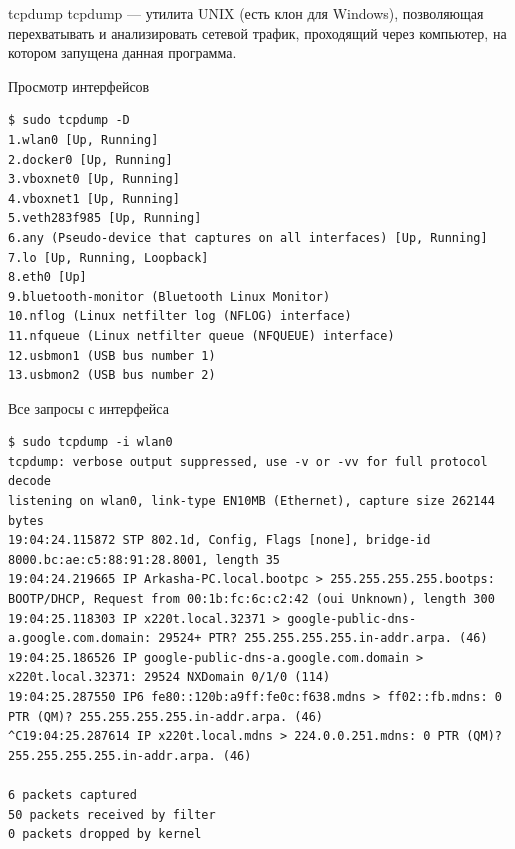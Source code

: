 \begin{frame}{tcpdump}
    tcpdump — утилита UNIX (есть клон для Windows), позволяющая перехватывать и
    анализировать сетевой трафик, проходящий через компьютер, на котором
    запущена данная программа.
\end{frame}

\begin{frame}[fragile]{Просмотр интерфейсов}
    \begin{Verbatim}[fontsize=\scriptsize]
$ sudo tcpdump -D
1.wlan0 [Up, Running]
2.docker0 [Up, Running]
3.vboxnet0 [Up, Running]
4.vboxnet1 [Up, Running]
5.veth283f985 [Up, Running]
6.any (Pseudo-device that captures on all interfaces) [Up, Running]
7.lo [Up, Running, Loopback]
8.eth0 [Up]
9.bluetooth-monitor (Bluetooth Linux Monitor)
10.nflog (Linux netfilter log (NFLOG) interface)
11.nfqueue (Linux netfilter queue (NFQUEUE) interface)
12.usbmon1 (USB bus number 1)
13.usbmon2 (USB bus number 2)
    \end{Verbatim}
\end{frame}

\begin{frame}[fragile]{Все запросы с интерфейса}
    \begin{Verbatim}[fontsize=\scriptsize]
$ sudo tcpdump -i wlan0
tcpdump: verbose output suppressed, use -v or -vv for full protocol decode
listening on wlan0, link-type EN10MB (Ethernet), capture size 262144 bytes
19:04:24.115872 STP 802.1d, Config, Flags [none], bridge-id 8000.bc:ae:c5:88:91:28.8001, length 35
19:04:24.219665 IP Arkasha-PC.local.bootpc > 255.255.255.255.bootps: BOOTP/DHCP, Request from 00:1b:fc:6c:c2:42 (oui Unknown), length 300
19:04:25.118303 IP x220t.local.32371 > google-public-dns-a.google.com.domain: 29524+ PTR? 255.255.255.255.in-addr.arpa. (46)
19:04:25.186526 IP google-public-dns-a.google.com.domain > x220t.local.32371: 29524 NXDomain 0/1/0 (114)
19:04:25.287550 IP6 fe80::120b:a9ff:fe0c:f638.mdns > ff02::fb.mdns: 0 PTR (QM)? 255.255.255.255.in-addr.arpa. (46)
^C19:04:25.287614 IP x220t.local.mdns > 224.0.0.251.mdns: 0 PTR (QM)? 255.255.255.255.in-addr.arpa. (46)

6 packets captured
50 packets received by filter
0 packets dropped by kernel
    \end{Verbatim}
\end{frame}

